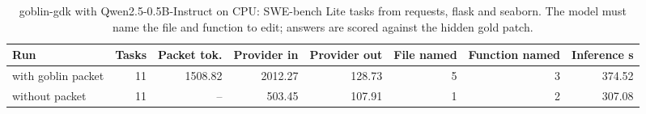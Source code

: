 \begin{table}[t]
\centering
\small
\begin{adjustbox}{max width=\linewidth}
\begin{tabular}{lrrrrrrr}
\toprule
Run & Tasks & Packet tok. & Provider in & Provider out & File named & Function named & Inference s \\
\midrule
with goblin packet & 11 & 1508.82 & 2012.27 & 128.73 & 5 & 3 & 374.52 \\
without packet & 11 & -- & 503.45 & 107.91 & 1 & 2 & 307.08 \\
\bottomrule
\end{tabular}
\end{adjustbox}
\caption{goblin-gdk with Qwen2.5-0.5B-Instruct on CPU: SWE-bench Lite tasks from requests, flask and seaborn. The model must name the file and function to edit; answers are scored against the hidden gold patch.}
\label{tab:gdk-demo}
\end{table}
